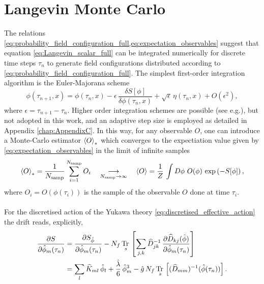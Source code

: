 \section{Langevin Monte Carlo}
The relations \eqref{eq:probability_field_configuration_full,eq:expectation_observables} suggest that equation \eqref{eq:Langevin_scalar_full} can be integrated numerically for discrete time steps $\tau_n$ to generate field configurations distributed according to \eqref{eq:probability_field_configuration_full}. 
The simplest first-order integration algorithm is the Euler-Majorana scheme \cite{ParisiWu}
\begin{equation*}
    \phi(\tau_{n+1}, x) = \phi(\tau_{n}, x) - \epsilon \,  \frac{\delta S[\phi]}{\delta \phi (\tau_n, x)} + \sqrt{\epsilon} \, \eta(\tau_n, x) + O(\epsilon^2),
\end{equation*}
where $\epsilon = \tau_{n+1} - \tau_n$. Higher order integration schemes are possible (see e.g.\cite{bilinearnoise1,Kronfeld1993}), but not adopted in this work, and an adaptive step size is employed as detailed in Appendix \ref{chap:AppendixC}.
In this way, for any observable $O$, one can introduce a Monte-Carlo estimator $\left\langle O \right\rangle_*$ which converges to the expectiation value given by \eqref{eq:expectation_observables} in the limit of infinite samples
\begin{equation}
    \expect{O}_{*} = \frac{1}{N_\text{samp}} \sum^{N_\text{samp}}_{i=1} O_i \quad \underset{N_\text{samp} \to \infty}{\longrightarrow} \quad \expect{O} = \frac{1}{Z} \, \int D\phi \ O(\phi) \, \exp\left(-S[\phi]\right),
    \label{eq:monte_carlo_estimator}
\end{equation}
where $O_i = O(\phi(\tau_i))$ is the sample of the observable $O$ done at time $\tau_i$. \\~\\
For the discretised action of the Yukawa theory \eqref{eq:discretised_effective_action} the drift reads, explicitly,
\begin{equation}
    \begin{aligned}
        \frac{\partial S}{\partial \hat{\phi}_m(\tau_n)} &= \frac{\partial S_{\hat{\phi}}}{\partial \hat{\phi}_m(\tau_n)} - N_f \, \underset{s}{\operatorname{\text{Tr} \,}} \left[\sum_{j,k} \widehat{D}^{-1}_{jk}  \, \frac{\partial \widehat{D}_{kj}(\hat{\phi})}{\partial \hat{\phi}_m(\tau_n)}\right] \\
        &= \sum_l \widehat{K}_{ml} \, \hat\phi_l + \frac{\hat\lambda}{6} \, \hat\phi_m^3 - \hat g \, N_f \, \underset{s}{\operatorname{\text{Tr} \,}} \left[(\widehat{D}_{mm})^{-1}(\hat{\phi}(\tau_n))\right].
    \end{aligned}
    \label{eq:drift_continuum_full_theory}
\end{equation}
